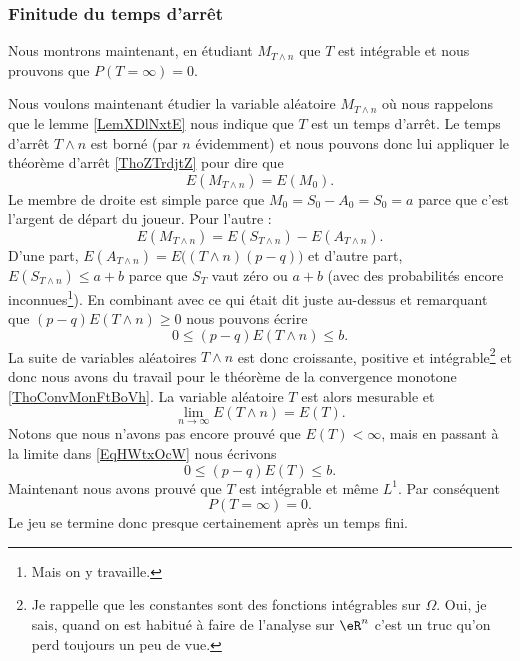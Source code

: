 \subsubsection{Finitude du temps d'arrêt}

Nous montrons maintenant, en étudiant \( M_{T\wedge n}\) que \( T\) est intégrable et nous prouvons que \( P(T=\infty)=0\).

Nous voulons maintenant étudier la variable aléatoire \( M_{T\wedge n}\) où nous rappelons que le lemme \ref{LemXDlNxtE} nous indique que \( T\) est un temps d'arrêt. Le temps d'arrêt \( T\wedge n\) est borné (par \( n\) évidemment) et nous pouvons donc lui appliquer le théorème d'arrêt \ref{ThoZTrdjtZ} pour dire que 
\begin{equation}
    E(M_{T\wedge n})=E(M_0).
\end{equation}
Le membre de droite est simple parce que \( M_0=S_0-A_0=S_0=a\) parce que c'est l'argent de départ du joueur. Pour l'autre :
\begin{equation}    \label{EqKEkJvBg}
    E(M_{T\wedge n})=E(S_{T\wedge n})-E(A_{T\wedge n}).
\end{equation}
D'une part, \( E(A_{T\wedge n})=E\big( (T\wedge n)(p-q) \big)\) et d'autre part, \( E(S_{T\wedge n})\leq a+b\) parce que \( S_T\) vaut zéro ou \( a+b\) (avec des probabilités encore inconnues\footnote{Mais on y travaille.}). En combinant avec ce qui était dit juste au-dessus et remarquant que \( (p-q)E(T\wedge n)\geq 0\) nous pouvons écrire
\begin{equation}    \label{EqHWtxOcW}
    0\leq (p-q)E(T\wedge n)\leq b.
\end{equation}
La suite de variables aléatoires \( T\wedge n\) est donc croissante, positive et intégrable\footnote{Je rappelle que les constantes sont des fonctions intégrables sur \( \Omega\). Oui, je sais, quand on est habitué à faire de l'analyse sur \( \eR^n\) c'est un truc qu'on perd toujours un peu de vue.} et donc nous avons du travail pour le théorème de la convergence monotone \ref{ThoConvMonFtBoVh}. La variable aléatoire \( T\) est alors mesurable et
\begin{equation}    \label{EqABPXmgr}
    \lim_{n\to \infty} E(T\wedge n)=E(T).
\end{equation}
Notons que nous n'avons pas encore prouvé que \( E(T)<\infty\), mais en passant à la limite dans \eqref{EqHWtxOcW} nous écrivons
\begin{equation}
    0\leq (p-q)E(T)\leq b.
\end{equation}
Maintenant nous avons prouvé que \( T\) est intégrable et même \( L^1\). Par conséquent 
\begin{equation}
    P(T=\infty)=0.
\end{equation}
Le jeu se termine donc presque certainement après un temps fini.

